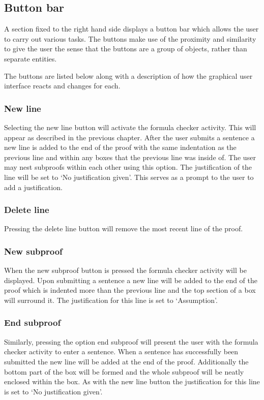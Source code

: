 \FloatBarrier




\subsection{Button bar}

A section fixed to the right hand side displays a button bar which allows the user to carry out various tasks. The buttons make use of the proximity and similarity to give the user the sense that the buttons are a group of objects, rather than separate entities. 

The buttons are listed below along with a description of how the graphical user interface reacts and changes for each.

\subsubsection{New line}

Selecting the new line button will activate the formula checker activity. This will appear as described in the previous chapter. After the user submits a sentence a new line is added to the end of the proof  with the same indentation as the previous line and within any boxes that the previous line was inside of. The user may nest subproofs within each other using this option. The justification of the line will be set to `No justification given'. This serves as a prompt to the user to add a justification.


\subsubsection*{Delete line}

Pressing the delete line button will remove the most recent line of the proof.

\subsubsection*{New subproof}
When the new subproof button is pressed the formula checker activity will be displayed. Upon submitting a sentence a new line will be added  to the end of the proof which is indented more than the previous line and the top section of a box will surround it. The justification for this line is set to `Assumption'.
\subsubsection*{End subproof}
Similarly, pressing the option end subproof will present the user with the formula checker activity to enter a sentence. When a sentence has successfully been submitted the new line will be added at the end of the proof. Additionally the bottom part of the box will be formed and the whole subproof will be neatly enclosed within the box. As with the new line button the justification for this line is set to `No justification given'.

